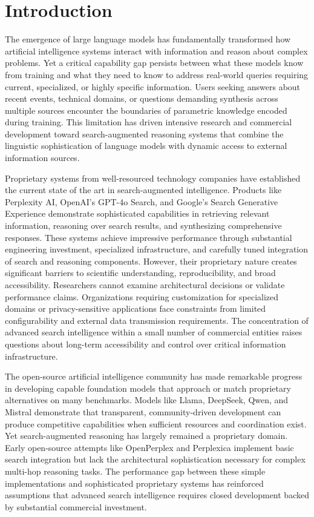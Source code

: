 \section{Introduction}

The emergence of large language models has fundamentally transformed how artificial intelligence systems interact with information and reason about complex problems. Yet a critical capability gap persists between what these models know from training and what they need to know to address real-world queries requiring current, specialized, or highly specific information. Users seeking answers about recent events, technical domains, or questions demanding synthesis across multiple sources encounter the boundaries of parametric knowledge encoded during training. This limitation has driven intensive research and commercial development toward search-augmented reasoning systems that combine the linguistic sophistication of language models with dynamic access to external information sources.

Proprietary systems from well-resourced technology companies have established the current state of the art in search-augmented intelligence. Products like Perplexity AI, OpenAI's GPT-4o Search, and Google's Search Generative Experience demonstrate sophisticated capabilities in retrieving relevant information, reasoning over search results, and synthesizing comprehensive responses. These systems achieve impressive performance through substantial engineering investment, specialized infrastructure, and carefully tuned integration of search and reasoning components. However, their proprietary nature creates significant barriers to scientific understanding, reproducibility, and broad accessibility. Researchers cannot examine architectural decisions or validate performance claims. Organizations requiring customization for specialized domains or privacy-sensitive applications face constraints from limited configurability and external data transmission requirements. The concentration of advanced search intelligence within a small number of commercial entities raises questions about long-term accessibility and control over critical information infrastructure.

The open-source artificial intelligence community has made remarkable progress in developing capable foundation models that approach or match proprietary alternatives on many benchmarks. Models like Llama, DeepSeek, Qwen, and Mistral demonstrate that transparent, community-driven development can produce competitive capabilities when sufficient resources and coordination exist. Yet search-augmented reasoning has largely remained a proprietary domain. Early open-source attempts like OpenPerplex and Perplexica implement basic search integration but lack the architectural sophistication necessary for complex multi-hop reasoning tasks. The performance gap between these simple implementations and sophisticated proprietary systems has reinforced assumptions that advanced search intelligence requires closed development backed by substantial commercial investment.

